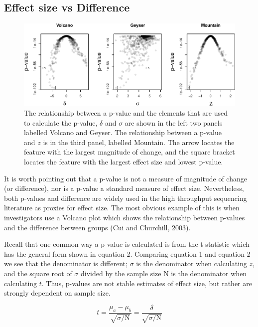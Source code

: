 \documentclass[onecolumn]{article}
\begin{document}
\hypertarget{effect-size-vs-difference}{%
\subsection{Effect size vs Difference}\label{effect-size-vs-difference}}

\begin{figure}
\centering
\includegraphics{effect_supplement_files/figure-latex/volcvseff-1.pdf}
\caption{The relationship between a p-value and the elements that are
used to calculate the p-value, \(\delta\) and \(\sigma\) are shown in
the left two panels labelled Volcano and Geyser. The relationship
between a p-value and \(z\) is in the third panel, labelled Mountain.
The arrow locates the feature with the largest magnitude of change, and
the square bracket locates the feature with the largest effect size and
lowest p-value.}
\end{figure}

It is worth pointing out that a p-value is not a measure of magnitude of
change (or difference), nor is a p-value a standard measure of effect
size. Nevertheless, both p-values and difference are widely used in the
high throughput sequencing literature as proxies for effect size. The
most obvious example of this is when investigators use a Volcano plot
which shows the relationship between p-values and the difference between
groups (Cui and Churchill, 2003).

Recall that one common way a p-value is calculated is from the
t-statistic which has the general form shown in equation 2. Comparing
equation 1 and equation 2 we see that the denominator is different;
\(\sigma\) is the denominator when calculating \(z\), and the square
root of \(\sigma\) divided by the sample size \(\mathrm{N}\) is the
denominator when calculating \(t\). Thus, p-values are not stable
estimates of effect size, but rather are strongly dependent on sample
size.

\begin{equation}
    t = \frac{\mu_a - \mu_b}{\sqrt{\sigma / \mathrm{N}}} = \frac{\delta}{\sqrt{\sigma / \mathrm{N}}}
    \label{ttest}
\end{equation}
\end{document}
